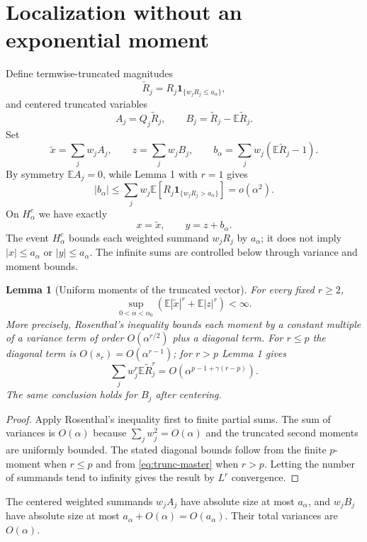 \documentclass[11pt,a4paper]{article}
\newtheorem{lemma}{Lemma}
\newcommand{\E}{\mathbb E}
\begin{document}
\section{Localization without an exponential moment}
Define termwise-truncated magnitudes
\[
\widetilde R_j=R_j\mathbf 1_{\{w_jR_j\le a_\alpha\}},
\]
and centered truncated variables
\[
A_j=Q_j\widetilde R_j,
\qquad
B_j=\widetilde R_j-\E\widetilde R_j.
\]
Set
\[
\widetilde x=\sum_jw_jA_j,
\qquad
z=\sum_jw_jB_j,
\qquad
b_\alpha=\sum_jw_j(\E\widetilde R_j-1).
\]
By symmetry $\E A_j=0$, while Lemma 1 with $r=1$ gives
\begin{equation}\label{eq:bias}
|b_\alpha|
\le \sum_jw_j\E[R_j\mathbf 1_{\{w_jR_j>a_\alpha\}}]
=o(\alpha^2).
\end{equation}
On $H_\alpha^c$ we have exactly
\begin{equation}\label{eq:trunc-identities}
x=\widetilde x,
\qquad
y=z+b_\alpha.
\end{equation}
The event $H_\alpha^c$ bounds each weighted summand $w_jR_j$ by $a_\alpha$;
it does not imply $|x|\le a_\alpha$ or $|y|\le a_\alpha$.  The infinite sums
are controlled below through variance and moment bounds.

\begin{lemma}[Uniform moments of the truncated vector]\label{lem:trunc-moments}
For every fixed $r\ge2$,
\[
\sup_{0<\alpha<\alpha_0}
\left(\E|\widetilde x|^r+\E|z|^r\right)<\infty.
\]
More precisely, Rosenthal's inequality bounds each moment by a constant multiple of a variance term of order $O(\alpha^{r/2})$ plus a diagonal term.  For $r\le p$ the diagonal term is $O(s_r)=O(\alpha^{r-1})$; for $r>p$ Lemma 1 gives
\[
\sum_jw_j^r\E\widetilde R_j^r
=O\!\left(\alpha^{p-1+\gamma(r-p)}\right).
\]
The same conclusion holds for $B_j$ after centering.
\end{lemma}

\begin{proof}
Apply Rosenthal's inequality first to finite partial sums.  The sum of variances is $O(\alpha)$ because $\sum_jw_j^2=O(\alpha)$ and the truncated second moments are uniformly bounded.  The stated diagonal bounds follow from the finite $p$-moment when $r\le p$ and from \eqref{eq:trunc-master} when $r>p$.  Letting the number of summands tend to infinity gives the result by $L^r$ convergence.
\end{proof}

The centered weighted summands $w_jA_j$ have absolute size at most $a_\alpha$, and $w_jB_j$ have absolute size at most $a_\alpha+O(\alpha)=O(a_\alpha)$.  Their total variances are $O(\alpha)$.
\end{document}

